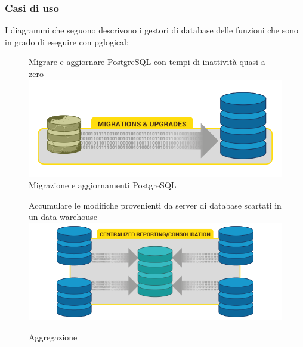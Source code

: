 \subsubsection{Casi di uso}
I diagrammi che seguono descrivono i gestori di database delle funzioni che sono in grado di eseguire con pglogical:

\begin{figure}[htbp]
\centering
Migrare e aggiornare PostgreSQL con tempi di inattivit\`{a} quasi a zero
\includegraphics[scale=0.70]{img/pglogical_1.png}\\

\caption{Migrazione e aggiornamenti PostgreSQL \label{figura1} \cite{etichetta3}}

Accumulare le modifiche provenienti da server di database scartati in un data warehouse
\includegraphics[scale=0.70]{img/pglogical_2.png}\\

\caption{Aggregazione \label{figura2} \cite{etichetta3}}
\end{figure}

